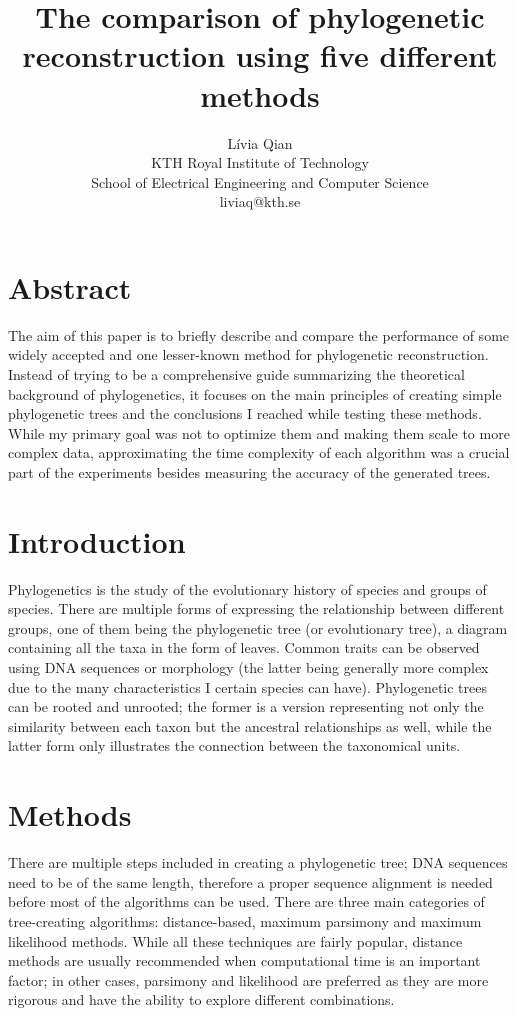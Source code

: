 \documentclass[11pt,twocolumn]{article}
\title{The comparison of phylogenetic reconstruction using five different methods}
\author{Lívia Qian\\KTH Royal Institute of Technology\\School of Electrical Engineering and Computer Science\\liviaq@kth.se}
\begin{document}
\date{}
\maketitle

\section*{Abstract}

The aim of this paper is to briefly describe and compare the performance of some widely accepted and one lesser-known method for phylogenetic reconstruction. Instead of trying to be a comprehensive guide summarizing the theoretical background of phylogenetics, it focuses on the main principles of creating simple phylogenetic trees and the conclusions I reached while testing these methods. While my primary goal was not to optimize them and making them scale to more complex data, approximating the time complexity of each algorithm was a crucial part of the experiments besides measuring the accuracy of the generated trees.

\section*{Introduction}

Phylogenetics is the study of the evolutionary history of species and groups of species. There are multiple forms of expressing the relationship between different groups, one of them being the phylogenetic tree (or evolutionary tree), a diagram containing all the taxa in the form of leaves. Common traits can be observed using DNA sequences or morphology (the latter being generally more complex due to the many characteristics I certain species can have). Phylogenetic trees can be rooted and unrooted; the former is a version representing not only the similarity between each taxon but the ancestral relationships as well, while the latter form only illustrates the connection between the taxonomical units.

\section*{Methods}

There are multiple steps included in creating a phylogenetic tree; DNA sequences need to be of the same length, therefore a proper sequence alignment is needed before most of the algorithms can be used. There are three main categories of tree-creating algorithms: distance-based, maximum parsimony and maximum likelihood methods. While all these techniques are fairly popular, distance methods are usually recommended when computational time is an important factor; in other cases, parsimony and likelihood are preferred as they are more rigorous and have the ability to explore different combinations.
\end{document}
